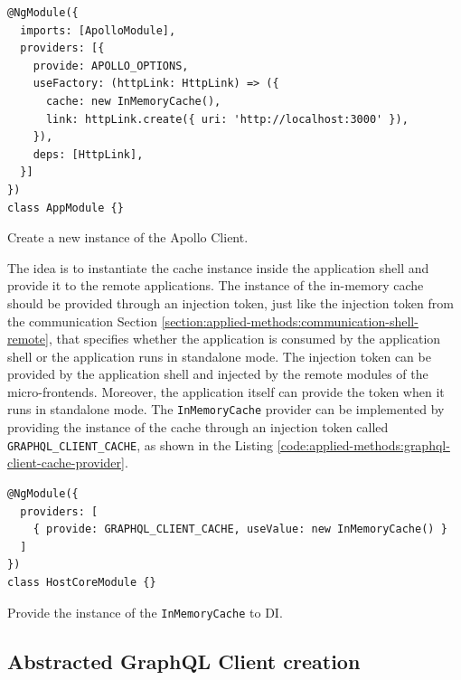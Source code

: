 \ifshowListings
\begin{listing}[H]
\begin{verbatim}
@NgModule({
  imports: [ApolloModule],
  providers: [{
    provide: APOLLO_OPTIONS,
    useFactory: (httpLink: HttpLink) => ({
      cache: new InMemoryCache(),
      link: httpLink.create({ uri: 'http://localhost:3000' }),
    }),
    deps: [HttpLink],
  }]
})
class AppModule {}
\end{verbatim}
\caption{Create a new instance of the Apollo Client.}\label{code:applied-methods:creating-the-apollo-client}
\end{listing}
\fi

\noindent The idea is to instantiate the cache instance inside the application shell and provide it to the remote applications. The instance of the in-memory cache should be provided through an injection token, just like the injection token from the communication Section \ref{section:applied-methods:communication-shell-remote}, that specifies whether the application is consumed by the application shell or the application runs in standalone mode. The injection token can be provided by the application shell and injected by the remote modules of the micro-frontends. Moreover, the application itself can provide the token when it runs in standalone mode. The \texttt{InMemoryCache} provider can be implemented by providing the instance of the cache through an injection token called \texttt{GRAPHQL\_CLIENT\_CACHE}, as shown in the Listing \ref{code:applied-methods:graphql-client-cache-provider}.

\ifshowListings
\begin{listing}[H]
\begin{verbatim}
@NgModule({
  providers: [
    { provide: GRAPHQL_CLIENT_CACHE, useValue: new InMemoryCache() }
  ]
})
class HostCoreModule {}
\end{verbatim}
\caption{Provide the instance of the \texttt{InMemoryCache} to \ac{DI}.}\label{code:applied-methods:graphql-client-cache-provider}
\end{listing}
\fi

\subsection{Abstracted GraphQL Client creation}

